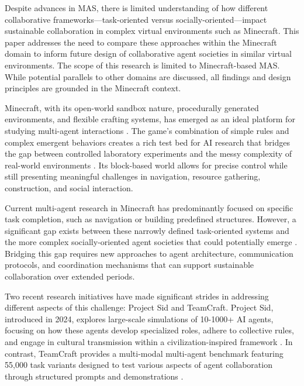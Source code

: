 \documentclass[a4paper, 12pt]{article}
\begin{document}
Despite advances in MAS, there is limited understanding of how different collaborative frameworks---task-oriented versus socially-oriented---impact sustainable collaboration in complex virtual environments such as Minecraft. This paper addresses the need to compare these approaches within the Minecraft domain to inform future design of collaborative agent societies in similar virtual environments. The scope of this research is limited to Minecraft-based MAS. While potential parallels to other domains are discussed, all findings and design principles are grounded in the Minecraft context.

Minecraft, with its open-world sandbox nature, procedurally generated environments, and flexible crafting systems, has emerged as an ideal platform for studying multi-agent interactions \autocite{fan2022minedojobuildingopenendedembodied}. The game's combination of simple rules and complex emergent behaviors creates a rich test bed for AI research that bridges the gap between controlled laboratory experiments and the messy complexity of real-world environments \autocite{zhao2024steveseriesstepbystepconstruction}. Its block-based world allows for precise control while still presenting meaningful challenges in navigation, resource gathering, construction, and social interaction.

Current multi-agent research in Minecraft has predominantly focused on specific task completion, such as navigation or building predefined structures. However, a significant gap exists between these narrowly defined task-oriented systems and the more complex socially-oriented agent societies that could potentially emerge \autocite{shu2024effectivegenaimultiagentcollaboration, qiu2024collaborativeintelligencepropagatingintentions}. Bridging this gap requires new approaches to agent architecture, communication protocols, and coordination mechanisms that can support sustainable collaboration over extended periods.

Two recent research initiatives have made significant strides in addressing different aspects of this challenge: Project Sid and TeamCraft. Project Sid, introduced in 2024, explores large-scale simulations of 10-1000+ AI agents, focusing on how these agents develop specialized roles, adhere to collective rules, and engage in cultural transmission within a civilization-inspired framework \autocite{al2024projectsidmanyagentsimulations}. In contrast, TeamCraft provides a multi-modal multi-agent benchmark featuring 55,000 task variants designed to test various aspects of agent collaboration through structured prompts and demonstrations \autocite{long2024teamcraftbenchmarkmultimodalmultiagent}.
\end{document}
